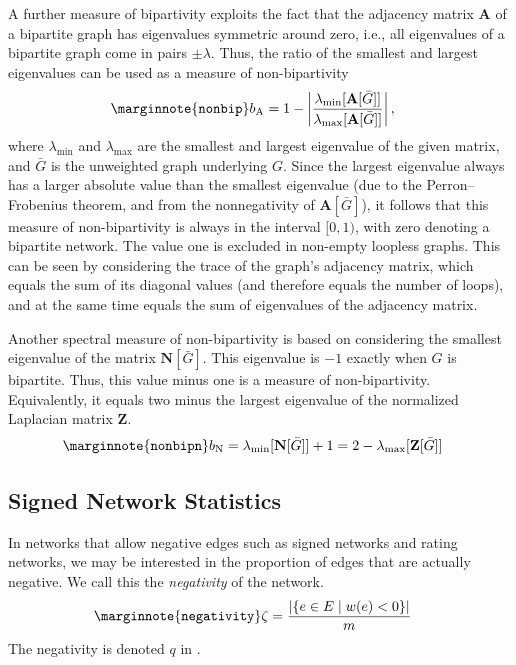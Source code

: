 \documentclass{article}
\begin{document}
A further measure of bipartivity exploits the fact that the adjacency
matrix $\mathbf A$ of a bipartite graph has eigenvalues symmetric around
zero, i.e., all eigenvalues of a bipartite graph come in pairs $\pm
\lambda$. Thus, the ratio of the smallest and largest eigenvalues can be
used as a measure of non-bipartivity
\begin{align}
  \marginnote{\texttt{nonbip}} b_{\mathrm A} &= 1 - \left| \frac
             {\lambda_{\min}[\mathbf A[\bar G]]} {\lambda_{\max}[\mathbf
                 A[\bar G]]} \right|,
\end{align}
where $\lambda_{\min}$ and $\lambda_{\max}$ are the smallest and largest
eigenvalue of the given matrix, and $\bar G$ is the unweighted graph
underlying $G$.  Since the largest eigenvalue always has a larger
absolute value than the smallest eigenvalue (due to the
Perron--Frobenius theorem, and from the nonnegativity of $\mathbf A[\bar
  G]$), it follows that this measure of non-bipartivity is always in the
interval $[0,1)$, with zero denoting a bipartite network.  The value one
is excluded in non-empty loopless graphs.  This can be seen by
considering the trace of the graph's adjacency matrix, which equals the
sum of its diagonal values (and therefore equals the number of loops),
and at the same time equals the sum of eigenvalues of the adjacency
matrix. 

Another spectral measure of non-bipartivity is based on considering the
smallest eigenvalue of the matrix $\mathbf N[\bar G]$.  This eigenvalue
is $-1$ exactly when $G$ is bipartite.  Thus, this value minus one is a
measure of non-bipartivity. Equivalently, it equals two minus the
largest eigenvalue of the normalized Laplacian matrix $\mathbf Z$.
\begin{align}
  \marginnote{\texttt{nonbipn}} b_{\mathrm N} &= \lambda_{\min}[\mathbf
    N[\bar G]] + 1 = 2 - \lambda_{\max}[\mathbf Z[\bar G]]
\end{align}

\subsection{Signed Network Statistics}
In networks that allow negative edges such as signed networks and rating
networks, we may be interested in the proportion of edges that are
actually negative.  We call this the \emph{negativity} of the network. 
\begin{align}
  \marginnote{\texttt{negativity}}
  \zeta &= \frac { | \{ e \in E \mid w(e) < 0 \} | } {m}
\end{align}
The negativity is denoted $q$ in \citep{b868}. 
\end{document}
